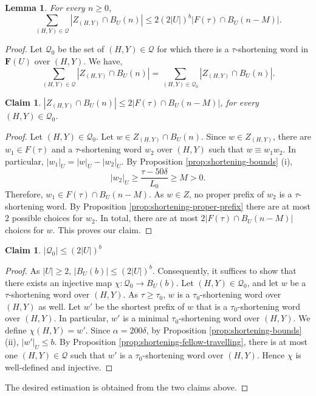 \documentclass[leqno,a4paper,10pt]{amsart}
\theoremstyle{plain}
\newtheorem{lem}[thm]{Lemma}
\newtheorem{cla}[thm]{Claim}
\theoremstyle{definition}
\theoremstyle{remark}
\newcommand{\F}{\mathbf{F}}
\newcommand{\scrQ}{\mathscr{Q}}
\let\le\leqslant
\let\ge\geqslant
\begin{document}
\begin{lem}
	\label{lem:growth shortening-free 3}
	For every $n\ge 0$,
	$$\sum_{(H,Y)\in\scrQ}|Z_{(H,Y)}\cap B_U(n)|\le 2(2|U|)^{b}|F(\tau)\cap B_U(n-M)|.$$
\end{lem}
\begin{proof}
	Let $\scrQ_0$ be the set of $(H,Y)\in\scrQ$ for which there is a $\tau$-shortening word in $\F(U)$ over $(H,Y)$. We have,
	$$\sum_{(H,Y)\in\scrQ}|Z_{(H,Y)}\cap B_U(n)|=\sum_{(H,Y)\in\scrQ_0}|Z_{(H,Y)}\cap B_U(n)|.$$
	
	\begin{cla}
		$|Z_{(H,Y)} \cap B_U(n)|\le 2|F(\tau) \cap B_U(n-M)|$, for every $(H,Y)\in \scrQ_0$.
	\end{cla}

	\begin{proof}
		Let $(H,Y)\in \scrQ_0$. Let $w\in Z_{(H,Y)} \cap B_U(n)$. Since $w\in Z_{(H,Y)}$, there are $w_1\in F(\tau)$ and a $\tau$-shortening word $w_2$ over $(H,Y)$ such that $w\equiv w_1w_2$. In particular, $|w_1|_U=|w|_U-|w_2|_U.$
		By Proposition \ref{prop:shortening-bounds} (i), 
		$$|w_2|_U\ge \frac{\tau-50\delta}{L_0}\ge M> 0.$$
		Therefore, $w_1\in F(\tau)\cap B_U(n-M)$. As $w\in Z$, no proper prefix of $w_2$ is a $\tau$-shortening word. By Proposition \ref{prop:shortening-proper-prefix} there are at most $2$ possible choices for $w_2$. In total, there are at most $2|F(\tau)\cap B_U(n-M)|$ choices for $w$. This proves our claim.
	\end{proof}
	
	\begin{cla}
		$|\scrQ_0|\le (2|U|)^{b}$
	\end{cla}

	\begin{proof}
As $|U|\ge 2$, $|B_U(b)|\le (2|U|)^{b}.$
		Consequently, it suffices to show that there exists an injective map $\chi\colon \scrQ_0\to B_U(b)$. Let $(H,Y)\in\scrQ_0$, and let $w$ be a $\tau$-shortening word over $(H,Y)$. 
		As $\tau\ge \tau_0$,  $w$ is a $\tau_0$-shortening word over $(H,Y)$ as well. Let $w'$ be the shortest prefix of $w$ that is a $\tau_0$-shortening word over $(H,Y)$. In particular, $w'$ is a minimal $\tau_0$-shortening word over $(H,Y)$. We define $\chi(H,Y)=w'$. Since $\alpha= 200\delta$, by Proposition \ref{prop:shortening-bounds} (ii), $|w'|_U\le b$.
		By Proposition \ref{prop:shortening-fellow-travelling}, there is at most one $(H,Y)\in\scrQ$ such that $w'$ is a $\tau_0$-shortening word over $(H,Y)$. Hence $\chi$ is well-defined and injective. 
	\end{proof}
	The desired estimation is obtained from the two claims above.	
\end{proof}
\end{document}
